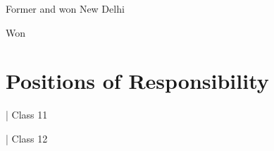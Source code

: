 \documentclass[]{deedy-resume-openfont}
\begin{document}

\begin{large}
\begin{tightemize}
    \item Former and won New Delhi
    \item Won 
\end{tightemize}
\end{large}

\sectionsep

%
%

\section{Positions of Responsibility}
\vspace{\topsep} %
\begin{large}
\begin{tightemize}
    \item {}| Class 11
    \item {}| Class 12
\end{tightemize}
\end{large}
\sectionsep
\end{document}
